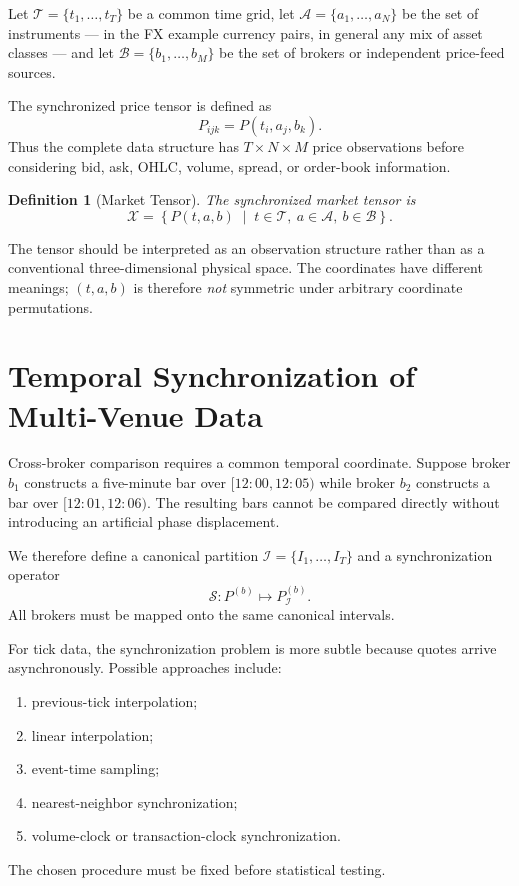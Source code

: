 \documentclass[11pt,a4paper]{article}
\numberwithin{equation}{section}
\newtheorem{definition}{Definition}[section]
\newcommand{\Tgrid}{\mathcal{T}}
\newcommand{\Aset}{\mathcal{A}}
\newcommand{\Bset}{\mathcal{B}}
\newcommand{\Xspace}{\mathcal{X}}
\begin{document}
Let $\Tgrid=\{t_1,\ldots,t_T\}$ be a common time grid, let
$\Aset=\{a_1,\ldots,a_N\}$ be the set of instruments --- in the FX
example currency pairs, in general any mix of asset classes --- and
let $\Bset=\{b_1,\ldots,b_M\}$ be the set of brokers or independent
price-feed sources.

The synchronized price tensor is defined as
\begin{equation}
P_{ijk}=P(t_i,a_j,b_k).
\label{eq:market_tensor}
\end{equation}
Thus the complete data structure has $T\times N\times M$ price
observations before considering bid, ask, OHLC, volume, spread, or
order-book information.

\begin{definition}[Market Tensor]
The synchronized market tensor is
\[
\Xspace=
\left\{
P(t,a,b)\;\middle|\;
t\in\Tgrid,\ a\in\Aset,\ b\in\Bset
\right\}.
\]
\end{definition}

The tensor should be interpreted as an observation structure rather
than as a conventional three-dimensional physical space. The
coordinates have different meanings; $(t,a,b)$ is therefore
\emph{not} symmetric under arbitrary coordinate permutations.

\section{Temporal Synchronization of Multi-Venue Data}

Cross-broker comparison requires a common temporal coordinate.
Suppose broker $b_1$ constructs a five-minute bar over
$[12{:}00,12{:}05)$ while broker $b_2$ constructs a bar over
$[12{:}01,12{:}06)$. The resulting bars cannot be compared directly
without introducing an artificial phase displacement.

We therefore define a canonical partition
$\mathcal{I}=\{I_1,\ldots,I_T\}$ and a synchronization operator
\[
\mathscr{S}:P^{(b)}\mapsto P^{(b)}_{\mathcal{I}}.
\]
All brokers must be mapped onto the same canonical intervals.

For tick data, the synchronization problem is more subtle because
quotes arrive asynchronously. Possible approaches include:
\begin{enumerate}
\item previous-tick interpolation;
\item linear interpolation;
\item event-time sampling;
\item nearest-neighbor synchronization;
\item volume-clock or transaction-clock synchronization.
\end{enumerate}
The chosen procedure must be fixed before statistical testing.
\end{document}
